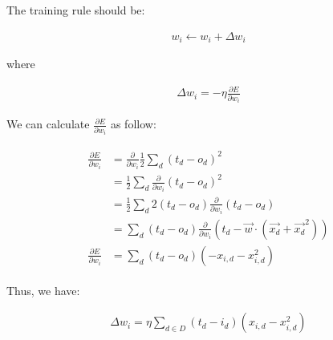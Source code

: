 \documentclass[preview]{standalone}
\begin{document}
\section{}

The training rule should be:

\begin{align}
    w_i\leftarrow w_i + \Delta w_i
\end{align}

where

\begin{align}
    \Delta w_i = -\eta\frac{\partial E}{\partial w_i}
\end{align}

We can calculate $\frac{\partial E}{\partial w_i}$ as follow:

\begin{align}
\begin{split}
\frac{\partial E}{\partial w_i}
&= \frac{\partial}{\partial w_i}\frac{1}{2}\sum_d(t_d-o_d)^2\\
&= \frac{1}{2}\sum_d\frac{\partial}{\partial w_i}(t_d-o_d)^2\\
&= \frac{1}{2}\sum_d2(t_d-o_d)\frac{\partial}{\partial w_i}(t_d-o_d)\\
&= \sum_d(t_d-o_d)\frac{\partial}{\partial w_i}(t_d-\vec{w}\cdot(\vec{x_d}+\vec{x_d}^2))\\
\frac{\partial E}{\partial w_i}
&= \sum_d(t_d-o_d)(-x_{i,d}-x_{i,d}^2)
\end{split}
\end{align}

Thus, we have:

\begin{align}
    \Delta w_i = \eta \sum_{d\in D} (t_d - i_d)(x_{i,d}-x_{i,d}^2)
\end{align}
\end{document}

